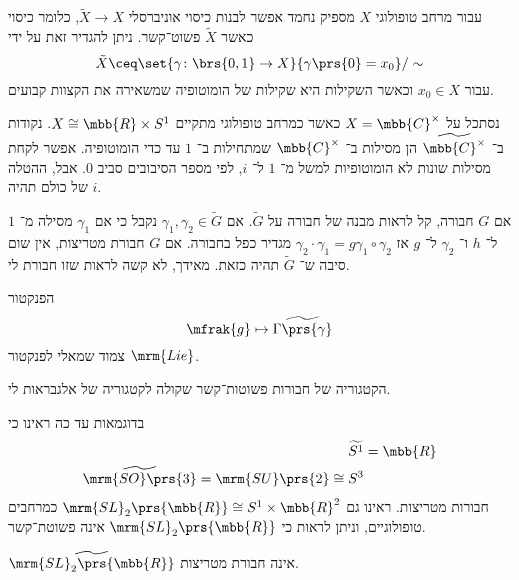 \documentclass[10pt, twoside]{book}
\newcommand{\Lie}{\mrm{Lie}}
\begin{document}
\begin{remark}
עבור מרחב טופולוגי
$X$
מספיק נחמד אפשר לבנות כיסוי אוניברסלי
$\tilde{X} \to X$,
כלומר כיסוי כאשר
$\tilde{X}$
פשוט־קשר.
ניתן להגדיר זאת על ידי
\[\tilde{X} \ceq \set{\gamma \colon \brs{0,1} \to X}{\gamma\prs{0} = x_0} / \sim\]
עבור
$x_0 \in X$
וכאשר השקילות היא שקילות של הומוטופיה שמשאירה את הקצוות קבועים.
\end{remark}

\begin{example}
נסתכל על
$X = \mbb{C}^\times$
כאשר כמרחב טופולוגי מתקיים
$X \cong \mbb{R} \times S^1$.
נקודות ב־%
$\widetilde{\mbb{C}^\times}$
הן מסילות ב־%
$\mbb{C}^\times$
שמתחילות ב־%
$1$
עד כדי הומוטופיה.
אפשר לקחת מסילות שונות לא הומוטופיות למשל מ־%
$1$
ל־%
$i$,
לפי מספר הסיבובים סביב
$0$.
אבל, ההטלה של כולם תהיה
$i$.
\end{example}

\begin{remark}
אם
$G$
חבורה, קל לראות מבנה של חבורה על
$\tilde{G}$.
אם
$\gamma_1, \gamma_2 \in \tilde{G}$
נקבל כי אם
$\gamma_1$
מסילה מ־%
$1$
ל־%
$h$
ו־%
$\gamma_2$
ל־%
$g$
אז
$\gamma_2 \cdot \gamma_1 = g \gamma_1 \circ \gamma_2$
מגדיר כפל בחבורה.
אם
$G$
חבורת מטריצות, אין שום סיבה ש־%
$\tilde{G}$
תהיה כזאת. מאידך, לא קשה לראות שזו חבורת לי.
\end{remark}



\begin{remark}
הפנקטור
\[\mfrak{g} \mapsto \widetilde{\Gamma\prs{\gamma}}\]
צמוד שמאלי לפנקטור
$\Lie$.
\end{remark}

\begin{remark}
הקטגוריה של חבורות פשוטות־קשר שקולה לקטגוריה של אלגבראות לי.
\end{remark}


\begin{example}
בדוגמאות עד כה ראינו כי
\begin{align*}
\widetilde{S^1} &= \mbb{R} \\
\widetilde{\mrm{SO}\prs{3}} = \mrm{SU}\prs{2} \cong S^3
\end{align*}
חבורות מטריצות. ראינו גם
$\mrm{SL}_2\prs{\mbb{R}} \cong S^1 \times \mbb{R}^2$
כמרחבים טופולוגיים, וניתן לראות כי
$\mrm{SL}_2\prs{\mbb{R}}$
אינה פשוטת־קשר.
\end{example}

\begin{proposition}
$\widetilde{\mrm{SL}_2\prs{\mbb{R}}}$
אינה חבורת מטריצות.
\end{proposition}
\end{document}
